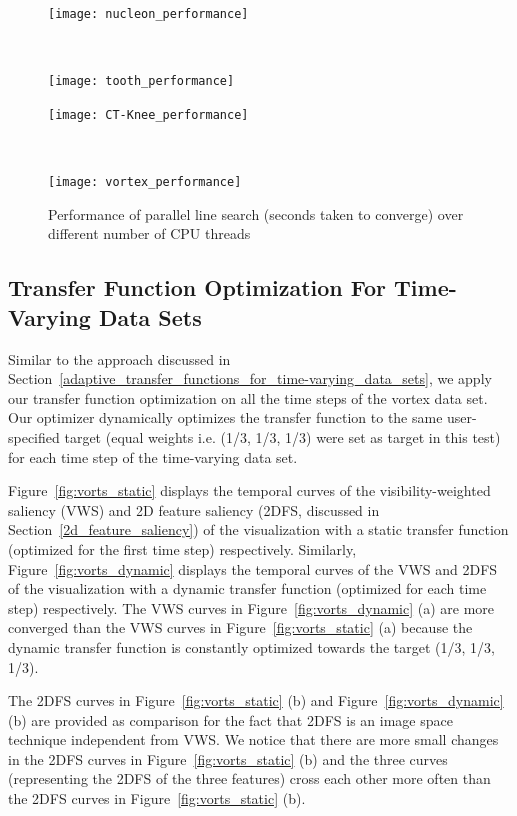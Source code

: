 \begin{figure}
	\centering
	\begin{minipage}{.5\textwidth}
		\texttt{[image: nucleon\_performance]}
	\end{minipage}~
	\begin{minipage}{.5\textwidth}
		\texttt{[image: tooth\_performance]}
	\end{minipage}
	\begin{minipage}{.5\textwidth}
		\texttt{[image: CT-Knee\_performance]}
	\end{minipage}~
	\begin{minipage}{.5\textwidth}
		\texttt{[image: vortex\_performance]}
	\end{minipage}
	\caption[Performance of parallel line search]{Performance of parallel line search (seconds taken to converge) over different number of CPU threads}
	\label{fig:parallelsearch_performance}
\end{figure}

\subsection{Transfer Function Optimization For Time-Varying Data Sets}
Similar to the approach discussed in Section~\ref{adaptive_transfer_functions_for_time-varying_data_sets}, we apply our transfer function optimization on all the time steps of the vortex data set. Our optimizer dynamically optimizes the transfer function to the same user-specified target (equal weights i.e. (1/3, 1/3, 1/3) were set as target in this test) for each time step of the time-varying data set. 

Figure~\ref{fig:vorts_static} displays the temporal curves of the visibility-weighted saliency (VWS) and 2D feature saliency (2DFS, discussed in Section~\ref{2d_feature_saliency}) of the visualization with a static transfer function (optimized for the first time step) respectively.
Similarly, Figure~\ref{fig:vorts_dynamic} displays the temporal curves of the VWS and 2DFS of the visualization with a dynamic transfer function (optimized for each time step) respectively.
The VWS curves in Figure~\ref{fig:vorts_dynamic} (a) are more converged than the VWS curves in Figure~\ref{fig:vorts_static} (a) because the dynamic transfer function is constantly optimized towards the target (1/3, 1/3, 1/3).

The 2DFS curves in Figure~\ref{fig:vorts_static} (b) and Figure~\ref{fig:vorts_dynamic} (b) are provided as comparison for the fact that 2DFS is an image space technique independent from VWS. We notice that there are more small changes in the 2DFS curves in Figure~\ref{fig:vorts_static} (b) and the three curves (representing the 2DFS of the three features) cross each other more often than the 2DFS curves in Figure~\ref{fig:vorts_static} (b).

